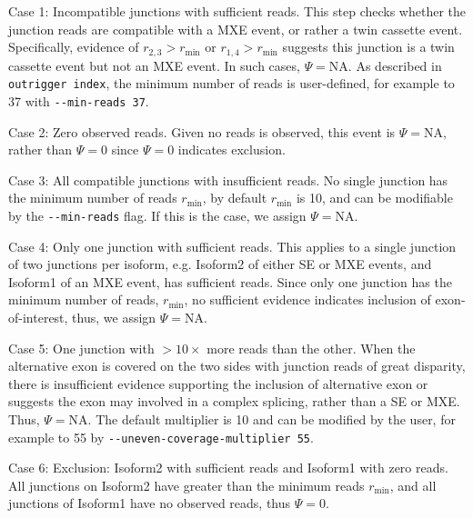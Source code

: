 \addtocounter{figure}{1}
\clearpage

\begin{longdescription}
	\item[Case 1: Incompatible junctions with sufficient reads.] This step checks whether the junction reads are compatible with a MXE event, or rather a twin cassette event. Specifically, evidence of  $r_{2,3} > r_{\min}$ or $r_{1,4} > r_{\min}$ suggests this junction is a twin cassette event but not an MXE event. In such cases, $\Psi = \text{NA}$. As described in \texttt{outrigger index}, the minimum number of reads is user-defined, for example to 37 with \texttt{-{}-min-reads~37}.
	\item[Case 2: Zero observed reads.] Given no reads is observed, this event is $\Psi = \text{NA}$, rather than $\Psi=0$ since $\Psi=0$ indicates exclusion.
	\item[Case 3: All compatible junctions with insufficient reads.] No single junction has the minimum number of reads $r_{\min}$, by default $r_{\min}$ is 10, and can be modifiable by the \texttt{-{}-min-reads} flag. If this is the case, we assign $\Psi = \text{NA}$.
	\item[Case 4: Only one junction with sufficient reads.] This applies to a single junction of two junctions per isoform, e.g. Isoform2 of either SE or MXE events, and Isoform1 of an MXE event, has sufficient reads. Since only one junction has the minimum number of reads, $r_{\min}$, no sufficient evidence indicates inclusion of exon-of-interest, thus, we assign $\Psi = \text{NA}$.
	\item[Case 5: One junction with $>10\times$ more reads than the other.] When the alternative exon is covered on the two sides with junction reads of great disparity, there is insufficient evidence supporting the inclusion of alternative exon or suggests the exon may involved in a complex splicing, rather than a SE or MXE. Thus, $\Psi = \text{NA}$. The default multiplier is 10 and can be modified by the user, for example to 55 by \texttt{-{}-uneven-coverage-multiplier~55}.
	\item[Case 6: Exclusion: Isoform2 with sufficient reads and Isoform1 with zero reads.] All junctions on Isoform2 have greater than the minimum reads $r_{\min}$, and all junctions of Isoform1 have no observed reads, thus $\Psi = 0$.

\end{longdescription}

